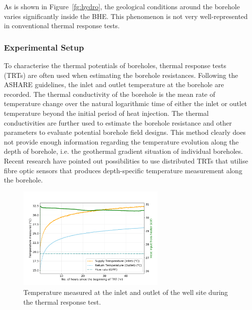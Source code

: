 	As is shown in Figure~\ref{fg:hydro}, the geological conditions around the borehole varies significantly inside the BHE. This phenomenon is not very well-represented in conventional thermal response tests.

\subsubsection{Experimental Setup}
	To characterise the thermal potentials of boreholes, thermal response tests (TRTs) are often used when estimating the borehole resistances. Following the ASHARE guidelines, the inlet and outlet temperature at the borehole are recorded. The thermal conductivity of the borehole is the mean rate of temperature change over the natural logarithmic time of either the inlet or outlet temperature beyond the initial period of heat injection. The thermal conductivities are further used to estimate the borehole resistance and other parameters to evaluate potential borehole field designs. This method clearly does not provide enough information regarding the temperature evolution along the depth of borehole, i.e. the geothermal gradient situation of individual boreholes. Recent research have pointed out possibilities to use distributed TRTs that utilise fibre optic sensors that produces depth-specific temperature measurement along the borehole.

	\begin{figure}[h!]
	\centering
	\includegraphics[width=0.65\textwidth]{data/TRT_SI}
	\caption{Temperature measured at the inlet and outlet of the well site during the thermal response test.}\label{fg:raw}
	\end{figure}

